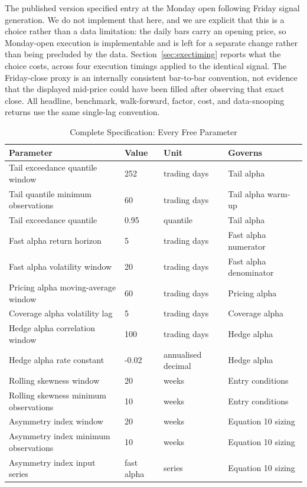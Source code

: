 \documentclass[11pt]{article}
\begin{document}
The published version specified entry at the Monday open following Friday signal generation. We do not implement that here, and we are explicit that this is a choice rather than a data limitation: the daily bars carry an opening price, so Monday-open execution is implementable and is left for a separate change rather than being precluded by the data. Section~\ref{sec:exectiming} reports what the choice costs, across four execution timings applied to the identical signal. The Friday-close proxy is an internally consistent bar-to-bar convention, not evidence that the displayed mid-price could have been filled after observing that exact close. All headline, benchmark, walk-forward, factor, cost, and data-snooping returns use the same single-lag convention.

\begin{table}[H]
\centering
\caption{Complete Specification: Every Free Parameter}
\label{tab:spec}
\scriptsize
\begin{tabular}{@{}llll@{}}
\toprule
Parameter & Value & Unit & Governs \\
\midrule
Tail exceedance quantile window & 252 & trading days & Tail alpha \\
Tail quantile minimum observations & 60 & trading days & Tail alpha warm-up \\
Tail exceedance quantile & 0.95 & quantile & Tail alpha \\
Fast alpha return horizon & 5 & trading days & Fast alpha numerator \\
Fast alpha volatility window & 20 & trading days & Fast alpha denominator \\
Pricing alpha moving-average window & 60 & trading days & Pricing alpha \\
Coverage alpha volatility lag & 5 & trading days & Coverage alpha \\
Hedge alpha correlation window & 100 & trading days & Hedge alpha \\
Hedge alpha rate constant & -0.02 & annualised decimal & Hedge alpha \\
Rolling skewness window & 20 & weeks & Entry conditions \\
Rolling skewness minimum observations & 10 & weeks & Entry conditions \\
Asymmetry index window & 20 & weeks & Equation 10 sizing \\
Asymmetry index minimum observations & 10 & weeks & Equation 10 sizing \\
Asymmetry index input series & fast alpha & series & Equation 10 sizing \\

\end{tabular}
\end{table}
\end{document}
